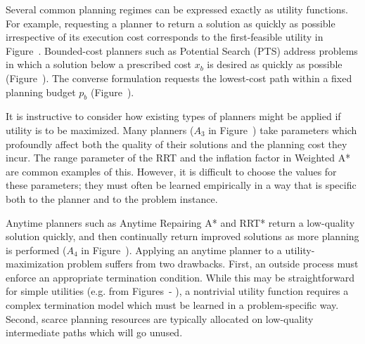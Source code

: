 
Several common planning regimes can be expressed exactly as
utility functions.
For example,
requesting a planner to return a solution as quickly as possible
irrespective of its execution cost corresponds to the first-feasible
utility in Figure~.
Bounded-cost planners such as Potential Search (PTS) \citep{stern2014}
address problems in which a solution below a prescribed cost $x_b$ is
desired as quickly as possible (Figure~).
The converse formulation requests the lowest-cost path
within a fixed planning budget $p_b$
(Figure~).

It is instructive to consider how existing types of planners
might be applied if utility is to be maximized.
Many planners
($A_3$ in Figure~)
take parameters which profoundly affect both the
quality of their solutions and the planning cost they incur.
The range parameter of the RRT \citep{lavallekuffner1999rrt}
and the inflation factor in Weighted A* \cite{pohl1970weightedastar}
are common examples of this.
However,
it is difficult to choose the values for these parameters;
they must often be learned empirically in a way that is
specific both to the planner and to the problem instance.

Anytime planners such as
Anytime Repairing A* \citep{likhachev2004arastar}
and RRT* \citep{karaman2010rrtstar}
return a low-quality solution quickly,
and then continually return improved solutions as more planning
is performed ($A_4$ in Figure~).
Applying an anytime planner to a utility-maximization problem suffers
from two drawbacks.
First,
an outside process must enforce an appropriate termination condition.
While this may be straightforward for simple utilities
(e.g. from Figures~-%
),
a nontrivial utility function requires a complex termination model
which must be learned in a problem-specific way.
Second,
scarce planning resources are typically allocated on low-quality
intermediate paths which will go unused.


